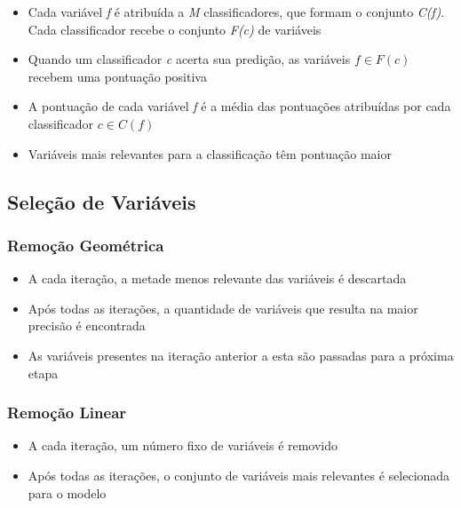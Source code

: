 \begin{frame}

\begin{itemize}
    \item Cada variável \textit{f} é atribuída a \textit{M} classificadores, que formam o conjunto \textit{C(f)}. Cada classificador recebe o conjunto \textit{F(c)} de variáveis
    \item Quando um classificador \textit{c} acerta sua predição, as variáveis $f \in F(c)$ recebem uma pontuação positiva
    \item A pontuação de cada variável \textit{f} é a média das pontuações atribuídas por cada classificador $c \in C(f)$
    \item Variáveis mais relevantes para a classificação têm pontuação maior
\end{itemize}

\end{frame}

\subsection{Seleção de Variáveis}

\begin{frame}
\frametitle{Remoção Geométrica}
\begin{itemize}
    \item A cada iteração, a metade menos relevante das variáveis é descartada
    \item Após todas as iterações, a quantidade de variáveis que resulta na maior precisão é encontrada
    \item As variáveis presentes na iteração anterior a esta são passadas para a próxima etapa
\end{itemize}
\end{frame}

\begin{frame}
\frametitle{Remoção Linear}
\begin{itemize}
    \item A cada iteração, um número fixo de variáveis é removido
    \item Após todas as iterações, o conjunto de variáveis mais relevantes é selecionada para o modelo
\end{itemize}
\end{frame}
